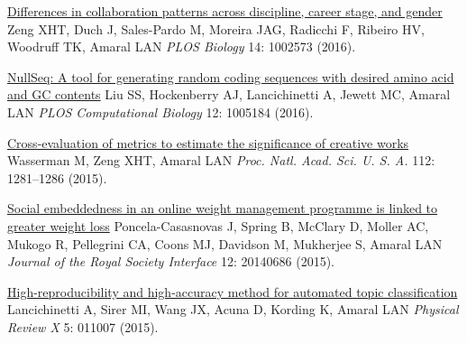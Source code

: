 \NumberedItem{\makebox[0.8cm][r]{[116]}}
\href{/people/amaral/differences-collaboration-patterns-across-discipline-career-stage-and-gender}
{Differences in collaboration patterns across discipline, career stage, and gender}
\newline
Zeng XHT, Duch J, Sales-Pardo M, Moreira JAG, Radicchi F, Ribeiro HV, Woodruff TK, Amaral LAN
\newline
\textit{PLOS Biology}
    14:
1002573 (2016).
\newline
\Gap
~
\Gap

\NumberedItem{\makebox[0.8cm][r]{[115]}}
\href{/people/amaral/nullseq-tool-generating-random-coding-sequences-desired-amino-acid-and-gc-contents}
{NullSeq: A tool for generating random coding sequences with desired amino acid and GC contents}
\newline
Liu SS, Hockenberry AJ, Lancichinetti A, Jewett MC, Amaral LAN
\newline
\textit{PLOS Computational Biology}
    12:
1005184 (2016).
\newline
\Gap
~
\Gap

\NumberedItem{\makebox[0.8cm][r]{[114]}}
\href{/people/amaral/cross-evaluation-metrics-estimate-significance-creative-works}
{Cross-evaluation of metrics to estimate the significance of creative works}
\newline
Wasserman M, Zeng XHT, Amaral LAN
\newline
\textit{Proc. Natl. Acad. Sci. U. S. A.}
    112:
1281--1286 (2015).
\newline
\Gap
~
\Gap

\NumberedItem{\makebox[0.8cm][r]{[113]}}
\href{/people/amaral/social-embeddedness-online-weight-management-programme-linked-greater-weight-loss}
{Social embeddedness in an online weight management programme is linked to greater weight loss}
\newline
Poncela-Casasnovas J, Spring B, McClary D, Moller AC, Mukogo R, Pellegrini CA, Coons MJ, Davidson M, Mukherjee S, Amaral LAN
\newline
\textit{Journal of the Royal Society Interface}
    12:
20140686 (2015).
\newline
\Gap
~
\Gap

\NumberedItem{\makebox[0.8cm][r]{[112]}}
\href{/people/amaral/high-reproducibility-and-high-accuracy-method-automated-topic-classification}
{High-reproducibility and high-accuracy method for automated topic classification}
\newline
Lancichinetti A, Sirer MI, Wang JX, Acuna D, Kording K, Amaral LAN
\newline
\textit{Physical Review X}
    5:
011007 (2015).
\newline
\Gap
~
\Gap


